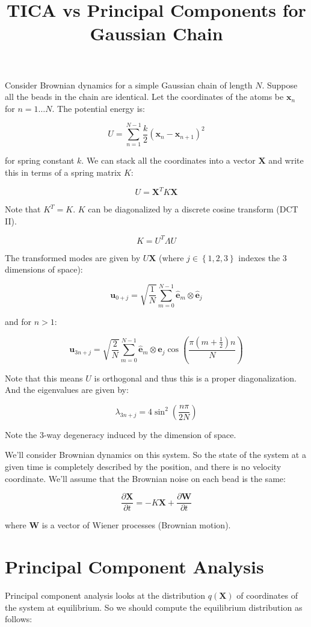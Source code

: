 \documentclass[]{scrartcl}
\title{TICA vs Principal Components for Gaussian Chain}
\newcommand{\s}[1]{\left\{ #1 \right\}}
\newcommand{\p}[1]{\left( #1 \right)}
\newcommand{\w}[1]{\mathbf{#1}}
\newcommand{\parfr}[2]{\frac{\partial #1}{\partial #2}}
\begin{document}
	
\maketitle

Consider Brownian dynamics for a simple Gaussian chain of length $N$. Suppose all the beads in the chain are identical. Let the coordinates of the atoms be $\w{x}_n$ for $n = 1\dots N$. The potential energy is:

$$
U = \sum_{n=1}^{N-1} \frac{k}{2}\p{\w{x}_n - \w{x}_{n+1}}^2
$$

for spring constant $k$. We can stack all the coordinates into a vector $\w{X}$ and write this in terms of a spring matrix $K$:

$$
U = \w{X}^TK\w{X}
$$

Note that $K^T = K$. $K$ can be diagonalized by a discrete cosine transform (DCT II).

$$
K = U^T\Lambda U
$$

The transformed modes are given by $U\w{X}$ (where $j\in\s{1,2,3}$ indexes the 3 dimensions of space):

$$
\w{u}_{0 + j} =
\sqrt{\frac{1}{N}} \sum_{m=0}^{N-1}
\w{\hat e}_m\otimes \w{\hat e}_j
$$

and for $n>1$:

$$
\w{u}_{3n + j} =
\sqrt{\frac{2}{N}} \sum_{m=0}^{N-1}
\w{\hat e}_m\otimes \w{\hat e}_j
\cos\p{\frac{\pi (m+\frac{1}{2}) n}{N}}
$$

Note that this means $U$ is orthogonal and thus this is a proper diagonalization. And the eigenvalues are given by:

$$
\lambda_{3n+j} = 4\sin^2\p{\frac{n\pi}{2N}}
$$

Note the 3-way degeneracy induced by the dimension of space.

We'll consider Brownian dynamics on this system. So the state of the system at a given time is completely described by the position, and there is no velocity coordinate. We'll assume that the Brownian noise on each bead is the same:

$$
\parfr{\w{X}}{t} = -K\w{X} + \parfr{\w{W}}{t}
$$

where $\w{W}$ is a vector of Wiener processes (Brownian motion).

\section{Principal Component Analysis}

Principal component analysis looks at the distribution $q(\w{X})$ of coordinates of the system at equilibrium. So we should compute the equilibrium distribution as follows:
\end{document}
